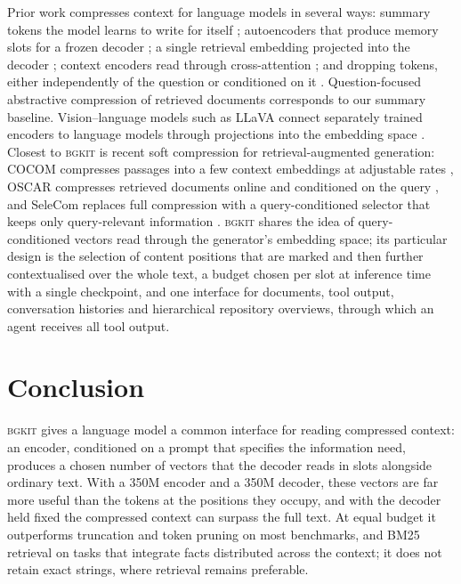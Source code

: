 \documentclass[11pt]{article}
\newcommand{\bgkit}{\textsc{bgkit}}
\begin{document}
Prior work compresses context for language models in several ways: summary tokens the model learns
to write for itself \citep{mu2023gist,chevalier2023autocompressors}; autoencoders that produce memory
slots for a frozen decoder \citep{ge2024icae}; a single retrieval embedding projected into the decoder
\citep{cheng2024xrag}; context encoders read through cross-attention \citep{yen2024cepe}; and
dropping tokens, either independently of the question \citep{jiang2023llmlingua,pan2024llmlingua2}
or conditioned on it \citep{jiang2024longllmlingua}. Question-focused abstractive compression of
retrieved documents \citep{xu2024recomp} corresponds to our summary baseline. Vision--language models
such as LLaVA connect separately trained encoders to language models through projections into the embedding space
\citep{liu2023llava}. Closest to \bgkit{} is recent soft compression for retrieval-augmented generation: COCOM compresses
passages into a few context embeddings at adjustable rates \citep{rau2025cocom}, OSCAR compresses
retrieved documents online and conditioned on the query \citep{louis2025oscar}, and SeleCom replaces
full compression with a query-conditioned selector that keeps only query-relevant information
\citep{liu2026selecom}. \bgkit{} shares the idea of query-conditioned vectors read through the
generator's embedding space; its particular design is the selection of content positions that are
marked and then further contextualised over the whole text, a budget chosen per slot at inference
time with a single checkpoint, and one interface for documents, tool output, conversation histories
and hierarchical repository overviews, through which an agent receives all tool output.

\section{Conclusion}

\bgkit{} gives a language model a common interface for reading compressed context: an encoder,
conditioned on a prompt that specifies the information need, produces a chosen number of vectors that
the decoder reads in slots alongside ordinary text. With a 350M encoder and a 350M decoder, these
vectors are far more useful than the tokens at the positions they occupy, and with the decoder held
fixed the compressed context can surpass the full text. At equal budget it outperforms truncation and
token pruning on most benchmarks, and BM25 retrieval on tasks that integrate facts distributed across
the context; it does not retain exact strings, where retrieval remains preferable.
\end{document}
